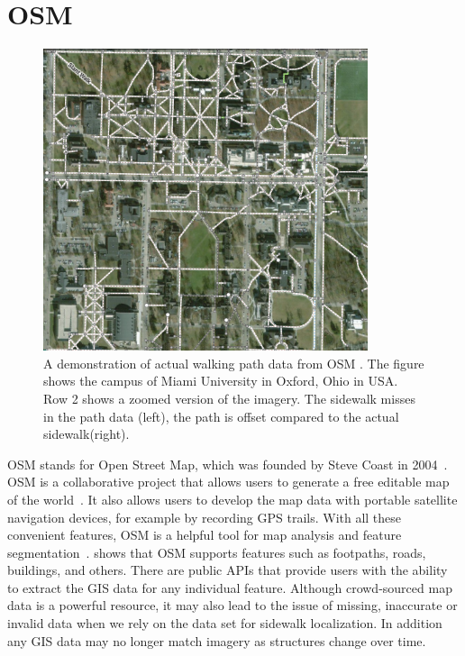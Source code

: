 \section{\ac{OSM}}\label{sec:osm}
\begin{figure}[H]
    \centering
    \includegraphics[width=0.85\textwidth]{Figures/oxford_path_data_osm.png}
    \caption[\ac{OSM} Walking Path]{A demonstration of actual walking path data from \ac{OSM} \cite{OpenStreetMap}. 
    The figure shows the campus of Miami University in Oxford, Ohio in USA. 
    Row 2 shows a zoomed version of the imagery.
    The sidewalk misses in the path data (left), the path is offset compared to the actual sidewalk(right).}

    \label{fig:osm_oxford_path}
\end{figure}

\ac{OSM} stands for Open Street Map, which was founded by Steve Coast in 2004~\cite{lasPiñas, OpenStreetMap}. 
\ac{OSM} is a collaborative project that allows users to generate a free editable map of the world~\cite{4653466}.
It also allows users to develop the map data with portable 
satellite navigation devices, for example by recording GPS trails. 
With all these convenient features, \ac{OSM} is a helpful tool for  map analysis
 and feature segmentation~\cite{10.1007/11744078_9}. 
 shows that \ac{OSM} supports features such as footpaths, roads, buildings, 
and others. There are public APIs that provide users with the ability to extract the \ac{GIS} data for 
any individual feature. 
Although crowd-sourced map data is a powerful resource, it may also lead to the issue of
missing, inaccurate or invalid data when we rely on the data set for sidewalk localization. 
In addition any GIS data may no longer match imagery as structures change over time.

